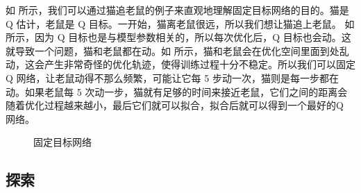 如 所示，我们可以通过猫追老鼠的例子来直观地理解固定目标网络的目的。猫是 Q 估计，老鼠是 Q 目标。一开始，猫离老鼠很远，所以我们想让猫追上老鼠。
如 所示，因为 Q 目标也是与模型参数相关的，所以每次优化后，Q 目标也会动。这就导致一个问题，猫和老鼠都在动。如 所示，猫和老鼠会在优化空间里面到处乱动，这会产生非常奇怪的优化轨迹，使得训练过程十分不稳定。所以我们可以固定 Q 网络，让老鼠动得不那么频繁，可能让它每 5 步动一次，猫则是每一步都在动。如果老鼠每 5 次动一步，猫就有足够的时间来接近老鼠，它们之间的距离会随着优化过程越来越小，最后它们就可以拟合，拟合后就可以得到一个最好的Q 网络。
\begin{figure}[hbt]
    \centering

    \caption{固定目标网络}
\end{figure}

\subsection{探索} 

